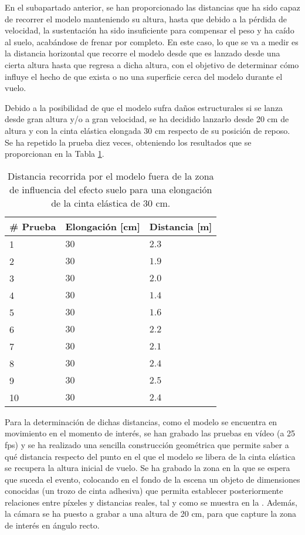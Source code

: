 En el subapartado anterior, se han proporcionado las distancias que ha sido capaz de recorrer el modelo manteniendo su altura, hasta que debido a la pérdida de velocidad, la sustentación ha sido insuficiente para compensar el peso y ha caído al suelo, acabándose de frenar por completo. En este caso, lo que se va a medir es la distancia horizontal que recorre el modelo desde que es lanzado desde una cierta altura hasta que regresa a dicha altura, con el objetivo de determinar cómo influye el hecho de que exista o no una superficie cerca del modelo durante el vuelo.

Debido a la posibilidad de que el modelo sufra daños estructurales si se lanza desde gran altura y/o a gran velocidad, se ha decidido lanzarlo desde 20 cm de altura y con la cinta elástica elongada 30 cm respecto de su posición de reposo. Se ha repetido la prueba diez veces, obteniendo los resultados que se proporcionan en la Tabla \ref{tab:testnoge}.

\begin{table}[ht]
\centering
\caption{Distancia recorrida por el modelo fuera de la zona de influencia del efecto suelo para una elongación de la cinta elástica de 30 cm.}
\label{tab:testnoge}
\begin{tabular}{lll}
\toprule
\# Prueba      & Elongación [cm] & Distancia [m]    \\ \midrule
1              & $30$            & $2.3$            \\
2              & $30$            & $1.9$            \\ 
3              & $30$            & $2.0$            \\ 
4              & $30$            & $1.4$            \\ 
5              & $30$            & $1.6$            \\ 
6              & $30$            & $2.2$            \\ 
7              & $30$            & $2.1$            \\ 
8              & $30$            & $2.4$            \\ 
9              & $30$            & $2.5$            \\ 
10             & $30$            & $2.4$            \\ 
\bottomrule
\end{tabular}
\end{table}

Para la determinación de dichas distancias, como el modelo se encuentra en movimiento en el momento de interés, se han grabado las pruebas en vídeo (a 25 fps) y se ha realizado una sencilla construcción geométrica que permite saber a qué distancia respecto del punto en el que el modelo se libera de la cinta elástica se recupera la altura inicial de vuelo. Se ha grabado la zona en la que se espera que suceda el evento, colocando en el fondo de la escena un objeto de dimensiones conocidas (un trozo de cinta adhesiva) que permita establecer posteriormente relaciones entre píxeles y distancias reales, tal y como se muestra en la . Además, la cámara se ha puesto a grabar a una altura de 20 cm, para que capture la zona de interés en ángulo recto.

